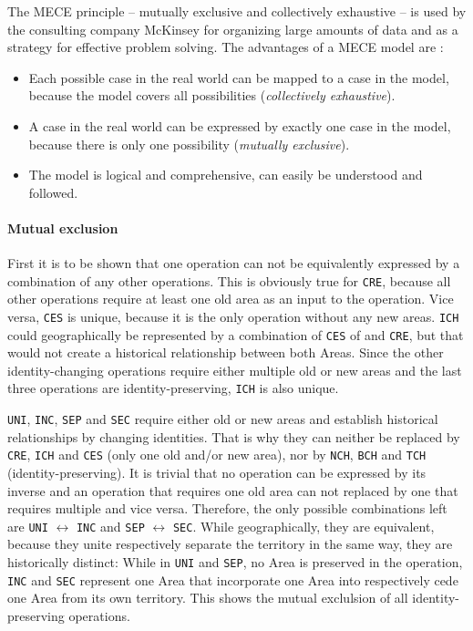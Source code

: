 The MECE principle -- mutually exclusive and collectively exhaustive -- is used by the consulting company McKinsey for organizing large amounts of data and as a strategy for effective problem solving. The advantages of a MECE model are \cite{mece}:
\begin{itemize}
  \item Each possible case in the real world can be mapped to a case in the model, because the model covers all possibilities (\emph{collectively exhaustive}).
  \item A case in the real world can be expressed by exactly one case in the model, because there is only one possibility (\emph{mutually exclusive}).
  \item The model is logical and comprehensive, can easily be understood and followed.
\end{itemize}


\paragraph{Mutual exclusion} %
\label{par:mutual_exclusion}

First it is to be shown that one operation can not be equivalently expressed by a combination of any other operations. This is obviously true for \texttt{CRE}, because all other operations require at least one old area as an input to the operation. Vice versa, \texttt{CES} is unique, because it is the only operation without any new areas. \texttt{ICH} could geographically be represented by a combination of \texttt{CES} of and \texttt{CRE}, but that would not create a historical relationship between both Areas. Since the other identity-changing operations require either multiple old or new areas and the last three operations are identity-preserving, \texttt{ICH} is also unique.

\texttt{UNI}, \texttt{INC}, \texttt{SEP} and \texttt{SEC} require either old or new areas and establish historical relationships by changing identities. That is why they can neither be replaced by \texttt{CRE}, \texttt{ICH} and \texttt{CES} (only one old and/or new area), nor by \texttt{NCH}, \texttt{BCH} and \texttt{TCH} (identity-preserving). It is trivial that no operation can be expressed by its inverse and an operation that requires one old area can not replaced by one that requires multiple and vice versa. Therefore, the only possible combinations left are \texttt{UNI} $\leftrightarrow$ \texttt{INC} and \texttt{SEP} $\leftrightarrow$ \texttt{SEC}. While geographically, they are equivalent, because they unite respectively separate the territory in the same way, they are historically distinct: While in \texttt{UNI} and \texttt{SEP}, no Area is preserved in the operation, \texttt{INC} and \texttt{SEC} represent one Area that incorporate one Area into respectively cede one Area from its own territory. This shows the mutual exclulsion of all identity-preserving operations.

